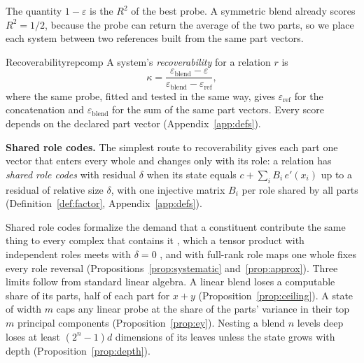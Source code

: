 \documentclass{article}
\theoremstyle{plain}
\theoremstyle{remark}
\begin{document}
The quantity $1 - \varepsilon$ is the $R^2$ of the best probe. A symmetric blend already scores $R^2 = 1/2$, because the probe can return the average of the two parts, so we place each system between two references built from the same part vectors.

\begin{defbox}{Recoverability}{repcomp}
A system's \emph{recoverability} for a relation $r$ is
\begin{equation}
  \kappa = \frac{\varepsilon_{\mathrm{blend}} - \varepsilon}{\varepsilon_{\mathrm{blend}} - \varepsilon_{\mathrm{ref}}},
  \label{eq:kappa}
\end{equation}
where the same probe, fitted and tested in the same way, gives $\varepsilon_{\mathrm{ref}}$ for the concatenation and $\varepsilon_{\mathrm{blend}}$ for the sum of the same part vectors. Every score depends on the declared part vector (Appendix~\ref{app:defs}).
\end{defbox}


\textbf{Shared role codes.}\label{sec:mechanics} The simplest route to recoverability gives each part one vector that enters every whole and changes only with its role: a relation has \emph{shared role codes} with residual $\delta$ when its state equals $c + \sum_i B_i\, e'(x_i)$ up to a residual of relative size $\delta$, with one injective matrix $B_i$ per role shared by all parts (Definition~\ref{def:factor}, Appendix~\ref{app:defs}).

Shared role codes formalize the demand that a constituent contribute the same thing to every complex that contains it \citep{fodor1988}, which a tensor product with independent roles meets with $\delta = 0$ \citep{smolensky1990}, and with full-rank role maps one whole fixes every role reversal (Propositions~\ref{prop:systematic} and~\ref{prop:approx}). Three limits follow from standard linear algebra. A linear blend loses a computable share of its parts, half of each part for $x + y$ (Proposition~\ref{prop:ceiling}). A state of width $m$ caps any linear probe at the share of the parts' variance in their top $m$ principal components (Proposition~\ref{prop:ey}). Nesting a blend $n$ levels deep loses at least $(2^n - 1)d$ dimensions of its leaves unless the state grows with depth (Proposition~\ref{prop:depth}).
\end{document}

